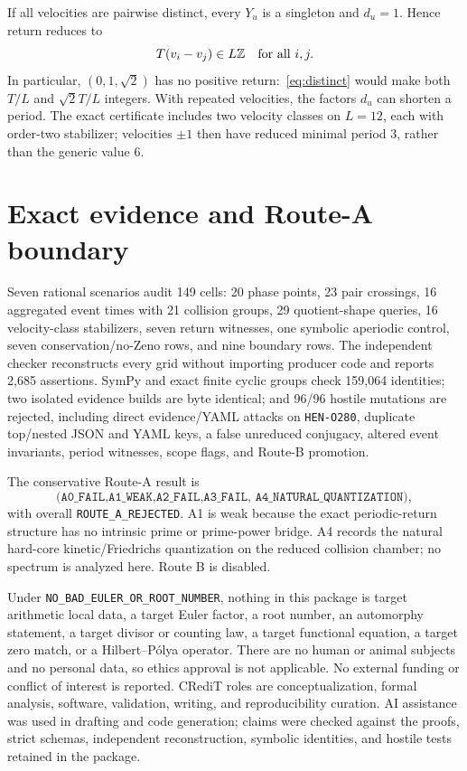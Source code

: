 \documentclass[10pt]{article}
\newcommand{\Z}{\mathbb Z}
\begin{document}
If all velocities are pairwise distinct, every $Y_u$ is a singleton and
$d_u=1$.  Hence return reduces to
\begin{equation}\label{eq:distinct}
 T(v_i-v_j)\in L\Z\quad\hbox{for all }i,j.
\end{equation}
In particular, $(0,1,\sqrt2)$ has no positive return:~\eqref{eq:distinct}
would make both $T/L$ and $\sqrt2T/L$ integers.  With repeated velocities,
the factors $d_u$ can shorten a period.  The exact certificate includes two
velocity classes on $L=12$, each with order-two stabilizer; velocities
$\pm1$ then have reduced minimal period $3$, rather than the generic value
$6$.

\section{Exact evidence and Route-A boundary}
Seven rational scenarios audit 149 cells: 20 phase points, 23 pair crossings,
16 aggregated event times with 21 collision groups, 29 quotient-shape
queries, 16 velocity-class stabilizers, seven return witnesses, one symbolic
aperiodic control, seven conservation/no-Zeno rows, and nine boundary rows.
The independent checker reconstructs every grid without importing producer
code and reports 2,685 assertions.  SymPy and exact finite cyclic groups check
159,064 identities; two isolated evidence builds are byte identical; and
96/96 hostile mutations are rejected, including direct evidence/YAML attacks
on \texttt{HEN-O280}, duplicate top/nested JSON
and YAML keys, a false unreduced conjugacy, altered event invariants, period
witnesses, scope flags, and Route-B promotion.

The conservative Route-A result is
\[
 \texttt{(A0\_FAIL,A1\_WEAK,A2\_FAIL,A3\_FAIL,
 A4\_NATURAL\_QUANTIZATION)},
\]
with overall \texttt{ROUTE\_A\_REJECTED}.  A1 is weak because the exact
periodic-return structure has no intrinsic prime or prime-power bridge.  A4
records the natural hard-core kinetic/Friedrichs quantization on the reduced
collision chamber; no spectrum is analyzed here.  Route B is disabled.

Under \texttt{NO\_BAD\_EULER\_OR\_ROOT\_NUMBER}, nothing in this package is
target arithmetic local data, a target Euler factor, a root number, an
automorphy statement, a target divisor or counting law, a target functional
equation, a target zero match, or a Hilbert--P\'olya operator.  There are no
human or animal subjects and no personal data, so ethics approval is not
applicable.  No external funding or conflict of interest is reported.  CRediT
roles are conceptualization, formal analysis, software, validation, writing,
and reproducibility curation.  AI assistance was used in drafting and code
generation; claims were checked against the proofs, strict schemas,
independent reconstruction, symbolic identities, and hostile tests retained
in the package.
\fi
\end{document}
